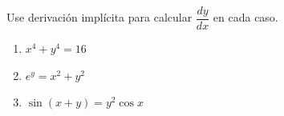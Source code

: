 Use derivación implícita para calcular $\dfrac{dy}{dx}$ en cada caso.
\begin{enumerate}
    \item $x^4 + y^4 = 16$
    \item $e^y = x^2 + y^2$
    \item $\sin(x + y) = y^2 \cos x$
\end{enumerate}
